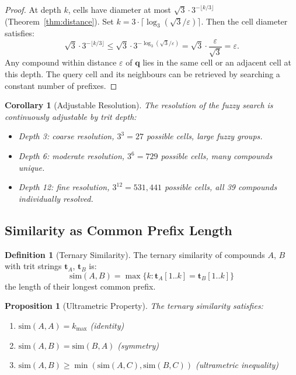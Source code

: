 \documentclass[11pt,a4paper]{article}
\newtheorem{proposition}[theorem]{Proposition}
\newtheorem{corollary}[theorem]{Corollary}
\theoremstyle{definition}
\newtheorem{definition}[theorem]{Definition}
\theoremstyle{remark}
\begin{document}
\begin{proof}
At depth $k$, cells have diameter at most $\sqrt{3} \cdot 3^{-\lfloor k/3 \rfloor}$ (Theorem~\ref{thm:distance}). Set $k = 3 \cdot \lceil \log_3(\sqrt{3}/\varepsilon) \rceil$. Then the cell diameter satisfies:
\begin{equation}
\sqrt{3} \cdot 3^{-\lfloor k/3 \rfloor} \leq \sqrt{3} \cdot 3^{-\log_3(\sqrt{3}/\varepsilon)} = \sqrt{3} \cdot \frac{\varepsilon}{\sqrt{3}} = \varepsilon.
\end{equation}
Any compound within distance $\varepsilon$ of $\mathbf{q}$ lies in the same cell or an adjacent cell at this depth. The query cell and its neighbours can be retrieved by searching a constant number of prefixes.
\end{proof}

\begin{corollary}[Adjustable Resolution]
\label{cor:adjustable}
The resolution of the fuzzy search is continuously adjustable by trit depth:
\begin{itemize}[nosep]
\item Depth 3: coarse resolution, $3^3 = 27$ possible cells, large fuzzy groups.
\item Depth 6: moderate resolution, $3^6 = 729$ possible cells, many compounds unique.
\item Depth 12: fine resolution, $3^{12} = 531{,}441$ possible cells, all 39 compounds individually resolved.
\end{itemize}
\end{corollary}

\subsection{Similarity as Common Prefix Length}

\begin{definition}[Ternary Similarity]
\label{def:similarity}
The ternary similarity of compounds $A$, $B$ with trit strings $\mathbf{t}_A$, $\mathbf{t}_B$ is:
\begin{equation}
\mathrm{sim}(A, B) = \max\{k : \mathbf{t}_A[1..k] = \mathbf{t}_B[1..k]\}
\label{eq:similarity}
\end{equation}
the length of their longest common prefix.
\end{definition}

\begin{proposition}[Ultrametric Property]
\label{prop:ultrametric}
The ternary similarity satisfies:
\begin{enumerate}[nosep]
\item $\mathrm{sim}(A, A) = k_{\max}$ \hfill (identity)
\item $\mathrm{sim}(A, B) = \mathrm{sim}(B, A)$ \hfill (symmetry)
\item $\mathrm{sim}(A, B) \geq \min(\mathrm{sim}(A, C), \mathrm{sim}(B, C))$ \hfill (ultrametric inequality)
\end{enumerate}
\end{proposition}
\end{document}
